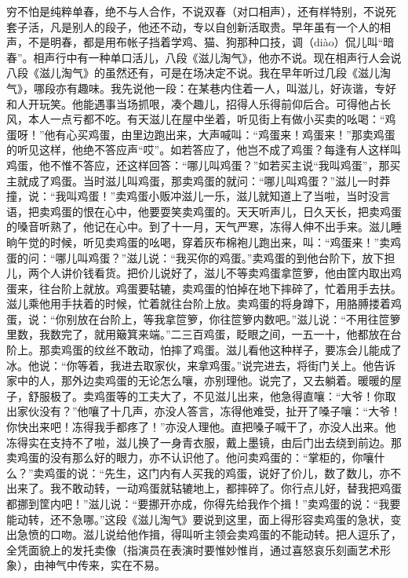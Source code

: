 \documentclass[12pt,UTF8]{ctexbook}
\begin{document}
穷不怕是纯粹单春，绝不与人合作，不说双春（对口相声），还有样特别，不说死套子活，凡是别人的段子，他还不动，专以自创新活取贵。早年虽有一个人的相声，不是明春，都是用布帐子挡着学鸡、猫、狗那种口技，调（diào）侃儿叫“暗春”。相声行中有一种单口活儿，八段《滋儿淘气》，他亦不说。现在相声行人会说八段《滋儿淘气》的虽然还有，可是在场决定不说。我在早年听过几段《滋儿淘气》，哪段亦有趣味。我先说他一段：在某巷内住着一人，叫滋儿，好诙谐，专好和人开玩笑。他能遇事当场抓哏，凑个趣儿，招得人乐得前仰后合。可得他占长风，本人一点亏都不吃。有天滋儿在屋中坐着，听见街上有做小买卖的吆喝：“鸡蛋呀！”他有心买鸡蛋，由里边跑出来，大声喊叫：“鸡蛋来！鸡蛋来！”那卖鸡蛋的听见这样，他绝不答应声“哎”。如若答应了，他岂不成了鸡蛋？每逢有人这样叫鸡蛋，他不惟不答应，还这样回答：“哪儿叫鸡蛋？”如若买主说“我叫鸡蛋”，那买主就成了鸡蛋。当时滋儿叫鸡蛋，那卖鸡蛋的就问：“哪儿叫鸡蛋？”滋儿一时莽撞，说：“我叫鸡蛋！”卖鸡蛋小贩冲滋儿一乐，滋儿就知道上了当啦，当时没言语，把卖鸡蛋的恨在心中，他要耍笑卖鸡蛋的。天天听声儿，日久天长，把卖鸡蛋的嗓音听熟了，他记在心中。到了十一月，天气严寒，冻得人伸不出手来。滋儿睡晌午觉的时候，听见卖鸡蛋的吆喝，穿着灰布棉袍儿跑出来，叫：“鸡蛋来！”卖鸡蛋的问：“哪儿叫鸡蛋？”滋儿说：“我买你的鸡蛋。”卖鸡蛋的到他台阶下，放下担儿，两个人讲价钱看货。把价儿说好了，滋儿不等卖鸡蛋拿笸箩，他由筐内取出鸡蛋来，往台阶上就放。鸡蛋要轱辘，卖鸡蛋的怕掉在地下摔碎了，忙着用手去扶。滋儿乘他用手扶着的时候，忙着就往台阶上放。卖鸡蛋的将身蹲下，用胳膊搂着鸡蛋，说：“你别放在台阶上，等我拿笸箩，你往笸箩内数吧。”滋儿说：“不用往笸箩里数，我数完了，就用簸箕来端。”二三百鸡蛋，眨眼之间，一五一十，他都放在台阶上。那卖鸡蛋的纹丝不敢动，怕摔了鸡蛋。滋儿看他这种样子，要冻会儿能成了冰。他说：“你等着，我进去取家伙，来拿鸡蛋。”说完进去，将街门关上。他告诉家中的人，那外边卖鸡蛋的无论怎么嚷，亦别理他。说完了，又去躺着。暖暖的屋子，舒服极了。卖鸡蛋等的工夫大了，不见滋儿出来，他急得直嚷：“大爷！你取出家伙没有？”他嚷了十几声，亦没人答言，冻得他难受，扯开了嗓子嚷：“大爷！你快出来吧！冻得我手都疼了！”亦没人理他。直把嗓子喊干了，亦没人出来。他冻得实在支持不了啦，滋儿换了一身青衣服，戴上墨镜，由后门出去绕到前边。那卖鸡蛋的没有那么好的眼力，亦不认识他了。他问卖鸡蛋的：“掌柜的，你嚷什么？”卖鸡蛋的说：“先生，这门内有人买我的鸡蛋，说好了价儿，数了数儿，亦不出来了。我不敢动转，一动鸡蛋就轱辘地上，都摔碎了。你行点儿好，替我把鸡蛋都挪到筐内吧！”滋儿说：“要挪开亦成，你得先给我作个揖！”卖鸡蛋的说：“我要能动转，还不急哪。”这段《滋儿淘气》要说到这里，面上得形容卖鸡蛋的急状，变出急愤的口吻。滋儿说给他作揖，得叫听主领会卖鸡蛋的不能动转。把人逗乐了，全凭面貌上的发托卖像（指演员在表演时要惟妙惟肖，通过喜怒哀乐刻画艺术形象），由神气中传来，实在不易。
\end{document}
